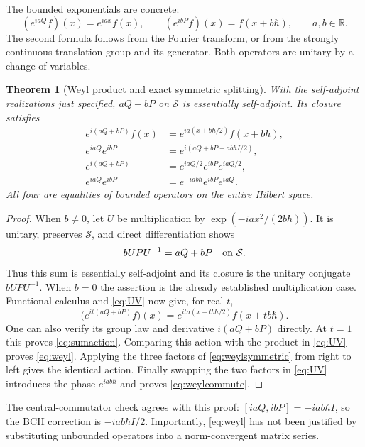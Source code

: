 \documentclass[11pt]{article}
\newtheorem{theorem}{Theorem}[section]
\theoremstyle{definition}
\theoremstyle{remark}
\newcommand{\R}{\mathbb R}
\numberwithin{equation}{section}
\begin{document}
The bounded exponentials are concrete:
\begin{equation}\label{eq:UV}
 (e^{iaQ}f)(x)=e^{iax}f(x),\qquad
 (e^{ibP}f)(x)=f(x+b\hbar),\qquad a,b\in\R.
\end{equation}
The second formula follows from the Fourier transform, or from the strongly continuous translation group and its generator. Both operators are unitary by a change of variables.

\begin{theorem}[Weyl product and exact symmetric splitting]\label{thm:weyl}
With the self-adjoint realizations just specified, $aQ+bP$ on $\mathcal S$ is essentially self-adjoint. Its closure satisfies
\begin{align}
 e^{i(aQ+bP)}f(x)&=e^{ia(x+b\hbar/2)}f(x+b\hbar),\label{eq:sumaction}\\
 e^{iaQ}e^{ibP}&=e^{i(aQ+bP-ab\hbar I/2)},\label{eq:weyl}\\
 e^{i(aQ+bP)}&=e^{iaQ/2}e^{ibP}e^{iaQ/2},\label{eq:weylsymmetric}\\
 e^{iaQ}e^{ibP}&=e^{-iab\hbar}e^{ibP}e^{iaQ}.\label{eq:weylcommute}
\end{align}
All four are equalities of bounded operators on the entire Hilbert space.
\end{theorem}
\begin{proof}
When $b\ne0$, let $U$ be multiplication by
$\exp(-iax^2/(2b\hbar))$. It is unitary, preserves $\mathcal S$, and direct differentiation shows
\[
 bUPU^{-1}=aQ+bP\quad\hbox{on }\mathcal S.
\]
Thus this sum is essentially self-adjoint and its closure is the unitary conjugate $bUPU^{-1}$. When $b=0$ the assertion is the already established multiplication case. Functional calculus and \eqref{eq:UV} now give, for real $t$,
\[
 \bigl(e^{it(aQ+bP)}f\bigr)(x)
  =e^{ita(x+tb\hbar/2)}f(x+tb\hbar).
\]
One can also verify its group law and derivative $i(aQ+bP)$ directly. At $t=1$ this proves \eqref{eq:sumaction}. Comparing this action with the product in \eqref{eq:UV} proves \eqref{eq:weyl}. Applying the three factors of \eqref{eq:weylsymmetric} from right to left gives the identical action. Finally swapping the two factors in \eqref{eq:UV} introduces the phase $e^{iab\hbar}$ and proves \eqref{eq:weylcommute}.
\end{proof}
The central-commutator check agrees with this proof:
$[iaQ,ibP]=-iab\hbar I$, so the BCH correction is $-iab\hbar I/2$. Importantly, \eqref{eq:weyl} has not been justified by substituting unbounded operators into a norm-convergent matrix series.
\end{document}

